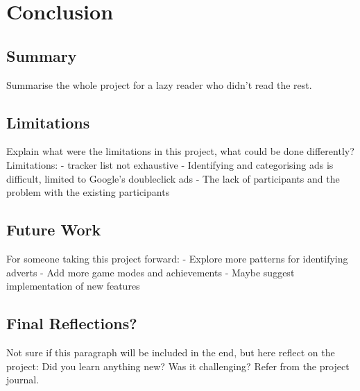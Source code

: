 \documentclass{l4proj}
\begin{document}
\chapter{Conclusion}    

\section{Summary}
Summarise the whole project for a lazy reader who didn't read the rest.

\section{Limitations}
Explain what were the limitations in this project, what could be done differently? 
Limitations:
 - tracker list not exhaustive
 - Identifying and categorising ads is difficult, limited to Google's doubleclick ads
 - The lack of participants and the problem with the existing participants

\section{Future Work}
For someone taking this project forward:
 - Explore more patterns for identifying adverts
 - Add more game modes and achievements
 - Maybe suggest implementation of new features

\section{Final Reflections?}
Not sure if this paragraph will be included in the end, but here reflect on the project: Did you learn anything new? Was it challenging? Refer from the project journal.

%
% 
\end{document}
